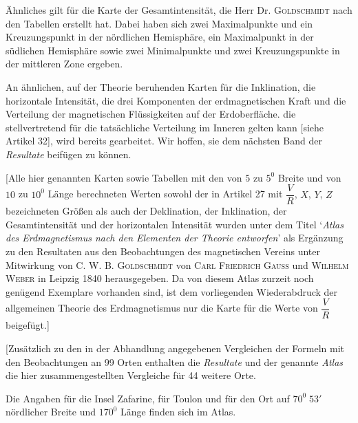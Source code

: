 \clearpage
{}
Ähnliches gilt für die Karte der Gesamtintensität, die Herr Dr. \textsc{Goldschmidt} nach den Tabellen erstellt hat. Dabei haben sich zwei Maximalpunkte und ein Kreuzungspunkt in der nördlichen Hemisphäre, ein Maximalpunkt in der südlichen Hemisphäre sowie zwei Minimalpunkte und zwei Kreuzungspunkte in der mittleren Zone ergeben.

An ähnlichen, auf der Theorie beruhenden Karten für die Inklination, die horizontale Intensität, die drei Komponenten der erdmagnetischen Kraft und die Verteilung der magnetischen Flüssigkeiten auf der Erdoberfläche. die stellvertretend für die tatsächliche Verteilung im Inneren gelten kann [siehe Artikel 32], wird bereits gearbeitet. Wir hoffen, sie dem nächsten Band der \textit{Resultate} beifügen zu können.

[Alle hier genannten Karten sowie Tabellen mit den von $5$ zu $5^0$ Breite und von $10$ zu $10^0$ Länge berechneten Werten sowohl der in Artikel 27 mit $\dfrac VR$, $X$, $Y$, $Z$ bezeichneten Größen als auch der Deklination, der Inklination, der Gesamtintensität und der horizontalen Intensität wurden unter dem Titel ‘\textit{Atlas des Erdmagnetismus nach den Elementen der Theorie entworfen}’ als Ergänzung zu den Resultaten aus den Beobachtungen des magnetischen Vereins unter Mitwirkung von \textsc{C. W. B. Goldschmidt} von \textsc{Carl Friedrich Gauss} und \textsc{Wilhelm Weber} in Leipzig 1840 herausgegeben. Da von diesem Atlas zurzeit noch genügend Exemplare vorhanden sind, ist dem vorliegenden Wiederabdruck der allgemeinen Theorie des Erdmagnetismus nur die Karte für die Werte von $\dfrac VR$ beigefügt.]

[Zusätzlich zu den in der Abhandlung angegebenen Vergleichen der Formeln mit den Beobachtungen an 99 Orten enthalten die \textit{Resultate} und der genannte \textit{Atlas} die hier zusammengestellten Vergleiche für 44 weitere Orte.

Die Angaben für die Insel Zafarine, für Toulon und für den Ort auf $70^0\;53'$ nördlicher Breite und $170^0$ Länge finden sich im Atlas.

